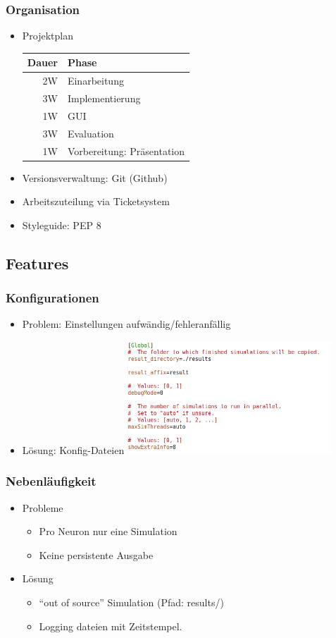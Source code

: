 \begin{frame}
  \frametitle{Organisation}
  \begin{itemize}
  \item Projektplan \\
    \begin{tabular}[H]{rl}
      Dauer & Phase \\ \hline
      2W & Einarbeitung \\
      3W & Implementierung \\
      1W & GUI \\
      3W & Evaluation \\
      1W & Vorbereitung: Präsentation
    \end{tabular}
  \item Versionsverwaltung: Git (Github)
  \item Arbeitszuteilung via Ticketsystem
  \item Styleguide: PEP 8
  \end{itemize}
\end{frame}

\subsection{Features}

\begin{frame}
  \frametitle{Konfigurationen}
  \begin{itemize}
  \item Problem: Einstellungen aufwändig/fehleranfällig
  \item<2-> Lösung: Konfig-Dateien
    \includegraphics[width=0.6\textwidth]{config-example.png}
  \end{itemize}
\end{frame}

\begin{frame}
  \frametitle{Nebenläufigkeit}

  \begin{itemize}
  \item Probleme
    \begin{itemize}
    \item Pro Neuron nur eine Simulation
    \item Keine persistente Ausgabe
    \end{itemize}
  \item<2-> Lösung
    \begin{itemize}
    \item ``out of source'' Simulation (Pfad: results/)
    \item Logging dateien mit Zeitstempel.
    \end{itemize}

  \end{itemize}
\end{frame}
